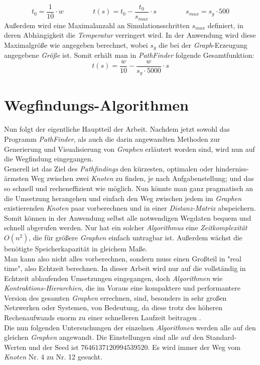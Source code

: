 \documentclass[12pt]{article}
\begin{document}
\[
t_0 = \dfrac{1}{10} \cdot w \hspace{50pt} t(s) = t_0 - \dfrac{t_0}{s_{max}} \cdot s \hspace{50pt} s_{max} = s_g \cdot 500
\]
Außerdem wird eine Maximalanzahl an Simulationsschritten $s_{max}$  definiert, in deren Abhängigkeit die \textit{Temperatur} verringert wird. In der Anwendung wird diese Maximalgröße wie angegeben berechnet, wobei $s_g$ die bei der \textit{Graph}-Erzeugung angegebene \textit{Größe} ist.
Somit erhält man in \textit{PathFinder} folgende Gesamtfunktion: 
\[
t(s) = \dfrac{w}{10} - \dfrac{w}{s_g \cdot 5000} \cdot s
\]
\section{Wegfindungs-Algorithmen}
Nun folgt der eigentliche Hauptteil der Arbeit. Nachdem jetzt sowohl das Programm \textit{PathFinder}, als auch die darin angewandten Methoden zur Generierung und Visualisierung von \textit{Graphen} erläutert worden sind, wird nun auf die Wegfindung eingegangen.
\\
Generell ist das Ziel des \textit{Pathfindings} den kürzesten, optimalen oder hinderniss- ärmsten Weg zwischen zwei \textit{Knoten} zu finden, je nach Aufgabenstellung; und das so schnell und recheneffizient wie möglich. Nun könnte man ganz pragmatisch an die Umsetzung herangehen und einfach den Weg zwischen jedem im \textit{Graphen} existierenden \textit{Knoten} paar vorberechnen und in einer \textit{Distanz-Matrix} abspeichern. Somit können in der Anwendung selbst alle notwendigen Wegdaten bequem und schnell abgerufen werden. Nur hat ein solcher \textit{Algorithmus} eine \textit{Zeitkomplexität} $O(n^2)$, die für größere \textit{Graphen} einfach untragbar ist. Außerdem wächst die benötigte Speicherkapazität in gleichem Maße.
\\
Man kann also nicht alles vorberechnen, sondern muss einen Großteil in "real time", also Echtzeit berechnen. In dieser Arbeit wird nur auf die vollständig in Echtzeit ablaufenden Umsetzungen eingegangen, doch \textit{Algorithmen} wie \textit{Kontraktions-Hierarchien}, die im Voraus eine kompaktere und performantere Version des gesamten \textit{Graphen} errechnen, sind, besonders in sehr großen Netzwerken oder Systemen, von Bedeutung, da diese trotz des höheren Rechenaufwands enorm zu einer schnelleren Laufzeit beitragen \cite{contr-hier}.
\\
Die nun folgenden Untersuchungen der einzelnen \textit{Algorithmen} werden alle auf den gleichen \textit{Graphen} angewandt. Die Einstellungen sind alle auf den Standard-Werten und der Seed ist $7646137120994539520$. Es wird immer der Weg vom \textit{Knoten} Nr. 4 zu Nr. 12 gesucht.
\end{document}
